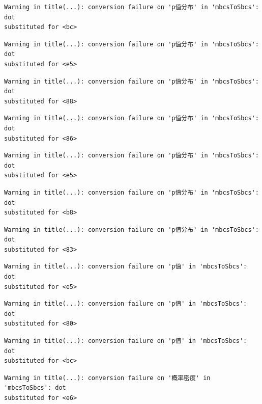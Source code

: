 \documentclass[
  letterpaper,
  DIV=11,
  numbers=noendperiod]{scrreprt}
\begin{document}
\begin{verbatim}
Warning in title(...): conversion failure on 'p值分布' in 'mbcsToSbcs': dot
substituted for <bc>
\end{verbatim}

\begin{verbatim}
Warning in title(...): conversion failure on 'p值分布' in 'mbcsToSbcs': dot
substituted for <e5>
\end{verbatim}

\begin{verbatim}
Warning in title(...): conversion failure on 'p值分布' in 'mbcsToSbcs': dot
substituted for <88>
\end{verbatim}

\begin{verbatim}
Warning in title(...): conversion failure on 'p值分布' in 'mbcsToSbcs': dot
substituted for <86>
\end{verbatim}

\begin{verbatim}
Warning in title(...): conversion failure on 'p值分布' in 'mbcsToSbcs': dot
substituted for <e5>
\end{verbatim}

\begin{verbatim}
Warning in title(...): conversion failure on 'p值分布' in 'mbcsToSbcs': dot
substituted for <b8>
\end{verbatim}

\begin{verbatim}
Warning in title(...): conversion failure on 'p值分布' in 'mbcsToSbcs': dot
substituted for <83>
\end{verbatim}

\begin{verbatim}
Warning in title(...): conversion failure on 'p值' in 'mbcsToSbcs': dot
substituted for <e5>
\end{verbatim}

\begin{verbatim}
Warning in title(...): conversion failure on 'p值' in 'mbcsToSbcs': dot
substituted for <80>
\end{verbatim}

\begin{verbatim}
Warning in title(...): conversion failure on 'p值' in 'mbcsToSbcs': dot
substituted for <bc>
\end{verbatim}

\begin{verbatim}
Warning in title(...): conversion failure on '概率密度' in 'mbcsToSbcs': dot
substituted for <e6>
\end{verbatim}
\end{document}
